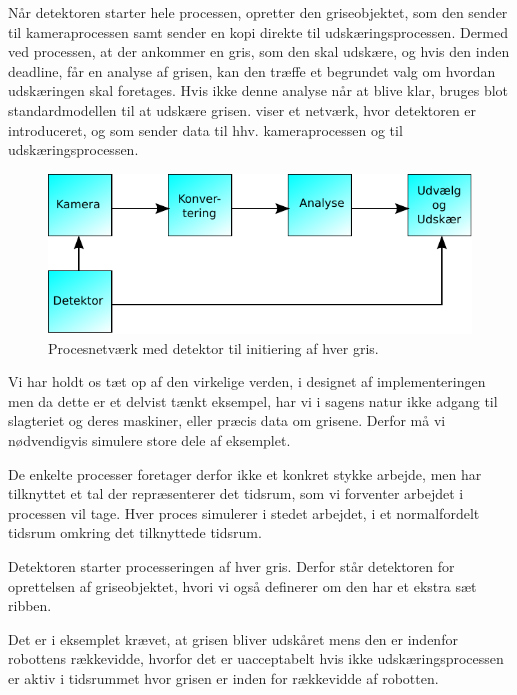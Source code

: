 Når detektoren starter hele processen, opretter den griseobjektet, som den sender til kameraprocessen samt sender en kopi direkte til udskæringsprocessen. Dermed ved processen, at der ankommer en gris, som den skal udskære, og hvis den inden deadline, får en analyse af grisen, kan den træffe et begrundet valg om hvordan udskæringen skal foretages. Hvis ikke denne analyse når at blive klar, bruges blot standardmodellen til at udskære grisen.  viser et  netværk, hvor detektoren er introduceret, og som sender data til hhv. kameraprocessen og til udskæringsprocessen. 

\begin{figure}
 \begin{center}
  \includegraphics[scale=1]{images/pig-network2}
	\caption{Procesnetværk med detektor til initiering af hver gris.}
	\label{fig:pig-network2}
\end{center}
\end{figure}

Vi har holdt os tæt op af den virkelige verden, i designet af implementeringen men da dette er et delvist tænkt eksempel, har vi i  sagens natur ikke  adgang til slagteriet og deres maskiner, eller præcis data om grisene. Derfor må vi nødvendigvis simulere store dele af eksemplet. 

De enkelte processer foretager derfor ikke et konkret stykke arbejde, men har  tilknyttet et tal der repræsenterer det tidsrum, som vi forventer arbejdet i processen vil tage. Hver proces simulerer i stedet arbejdet, i et normalfordelt tidsrum omkring det tilknyttede tidsrum.

Detektoren starter processeringen af hver gris. Derfor står detektoren for oprettelsen af griseobjektet, hvori vi også  definerer om den har et ekstra sæt ribben. 

Det er i eksemplet  krævet, at grisen bliver udskåret mens den er indenfor robottens rækkevidde, hvorfor det er uacceptabelt hvis ikke udskæringsprocessen er aktiv i tidsrummet hvor grisen er inden for rækkevidde af robotten. 

